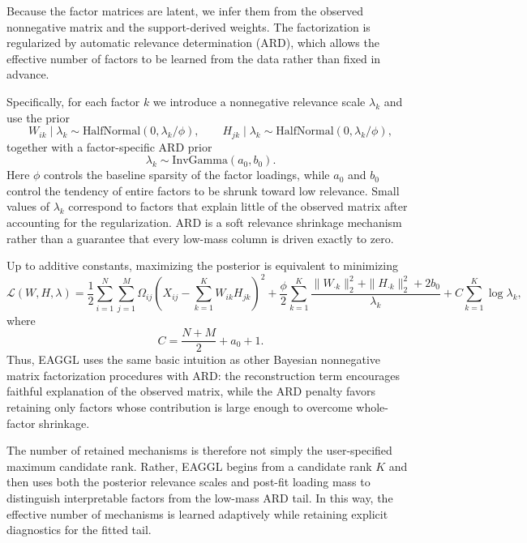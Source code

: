 \documentclass[11pt]{article}
\begin{document}
Because the factor matrices are latent, we infer them from the observed nonnegative matrix and the support-derived weights. The factorization is regularized by automatic relevance determination (ARD), which allows the effective number of factors to be learned from the data rather than fixed in advance.

Specifically, for each factor $k$ we introduce a nonnegative relevance scale $\lambda_k$ and use the prior
\begin{equation}
W_{ik} \mid \lambda_k \sim \text{HalfNormal}\left(0, \lambda_k / \phi \right),
\qquad
H_{jk} \mid \lambda_k \sim \text{HalfNormal}\left(0, \lambda_k / \phi \right),
\label{eq:eaggl_halfnormal_prior}
\end{equation}
together with a factor-specific ARD prior
\begin{equation}
\lambda_k \sim \text{InvGamma}(a_0, b_0).
\label{eq:eaggl_ard_prior}
\end{equation}
Here $\phi$ controls the baseline sparsity of the factor loadings, while $a_0$ and $b_0$ control the tendency of entire factors to be shrunk toward low relevance. Small values of $\lambda_k$ correspond to factors that explain little of the observed matrix after accounting for the regularization. ARD is a soft relevance shrinkage mechanism rather than a guarantee that every low-mass column is driven exactly to zero.

Up to additive constants, maximizing the posterior is equivalent to minimizing
\begin{equation}
\mathcal{L}(W,H,\lambda)
=
\frac{1}{2}
\sum_{i=1}^N \sum_{j=1}^M
\Omega_{ij}
\left(
X_{ij} - \sum_{k=1}^K W_{ik} H_{jk}
\right)^2
+
\frac{\phi}{2}
\sum_{k=1}^K
\frac{
\|W_{\cdot k}\|_2^2 + \|H_{\cdot k}\|_2^2 + 2b_0
}{
\lambda_k
}
+
C
\sum_{k=1}^K
\log \lambda_k,
\label{eq:eaggl_objective}
\end{equation}
where
\begin{equation}
C = \frac{N + M}{2} + a_0 + 1.
\label{eq:eaggl_C}
\end{equation}
Thus, EAGGL uses the same basic intuition as other Bayesian nonnegative matrix factorization procedures with ARD: the reconstruction term encourages faithful explanation of the observed matrix, while the ARD penalty favors retaining only factors whose contribution is large enough to overcome whole-factor shrinkage.

The number of retained mechanisms is therefore not simply the user-specified maximum candidate rank. Rather, EAGGL begins from a candidate rank $K$ and then uses both the posterior relevance scales and post-fit loading mass to distinguish interpretable factors from the low-mass ARD tail. In this way, the effective number of mechanisms is learned adaptively while retaining explicit diagnostics for the fitted tail.
\end{document}
